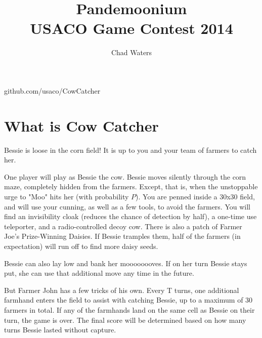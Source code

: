 \documentclass[11pt]{article}
\title{\textbf{Pandemoonium}\\USACO Game Contest 2014}
\author{Chad Waters}
\date{}
\begin{document}
\maketitle

\begin{center}
github.com/usaco/CowCatcher
\end{center}

\section{What is Cow Catcher}

Bessie is loose in the corn field! It is up to you and your team of farmers to catch her.

One player will play as Bessie the cow. Bessie moves silently through the corn maze, completely hidden from the farmers. Except, that is, when the unstoppable urge to "Moo" hits her (with probability $P$). You are penned inside a 30x30 field, and will use your cunning, as well as a few tools, to avoid the farmers. You will find an invisibility cloak (reduces the chance of detection by half), a one-time use teleporter, and a radio-controlled decoy cow. There is also a patch of Farmer Joe's Prize-Winning Daisies. If Bessie tramples them, half of the farmers (in expectation) will run off to find more daisy seeds.

Bessie can also lay low and bank her moooooooves. If on her turn Bessie stays put, she can use that additional move any time in the future.

But Farmer John has a few tricks of his own. Every T turns, one additional farmhand enters the field to assist with catching Bessie, up to a maximum of 30 farmers in total. If any of the farmhands land on the same cell as Bessie on their turn, the game is over. The final score will be determined based on how many turns Bessie lasted without capture.
\end{document}
